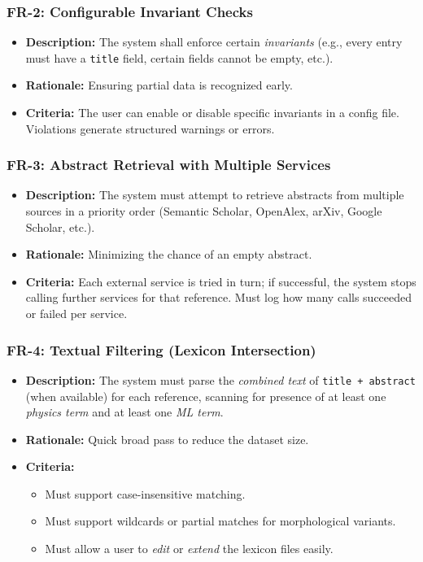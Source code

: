 \documentclass[12pt]{article}
\begin{document}
\subsubsection{FR-2: Configurable Invariant Checks}
\begin{itemize}
  \item \textbf{Description:} The system shall enforce certain \emph{invariants} (e.g., every entry must have a \texttt{title} field, certain fields cannot be empty, etc.).
  \item \textbf{Rationale:} Ensuring partial data is recognized early. 
  \item \textbf{Criteria:} The user can enable or disable specific invariants in a config file. Violations generate structured warnings or errors.
\end{itemize}

\subsubsection{FR-3: Abstract Retrieval with Multiple Services}
\begin{itemize}
  \item \textbf{Description:} The system must attempt to retrieve abstracts from multiple sources in a priority order (Semantic Scholar, OpenAlex, arXiv, Google Scholar, etc.). 
  \item \textbf{Rationale:} Minimizing the chance of an empty abstract. 
  \item \textbf{Criteria:} Each external service is tried in turn; if successful, the system stops calling further services for that reference. Must log how many calls succeeded or failed per service.
\end{itemize}

\subsubsection{FR-4: Textual Filtering (Lexicon Intersection)}
\begin{itemize}
  \item \textbf{Description:} The system must parse the \emph{combined text} of \texttt{title + abstract} (when available) for each reference, scanning for presence of at least one \emph{physics term} and at least one \emph{ML term}.
  \item \textbf{Rationale:} Quick broad pass to reduce the dataset size. 
  \item \textbf{Criteria:} 
  \begin{itemize}
    \item Must support case-insensitive matching.
    \item Must support wildcards or partial matches for morphological variants.
    \item Must allow a user to \emph{edit} or \emph{extend} the lexicon files easily.
  \end{itemize}
\end{itemize}
\end{document}

